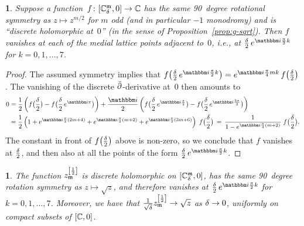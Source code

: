 \documentclass[12pt,oneside,english]{amsart}
\numberwithin{equation}{section}
\numberwithin{figure}{section}
\theoremstyle{plain}
\theoremstyle{plain}
\theoremstyle{plain}
\newtheorem{prop}[thm]{\protect\propositionname}
\theoremstyle{plain}
\newtheorem{lem}[thm]{\protect\lemmaname}
\theoremstyle{remark}
\theoremstyle{definition}
\theoremstyle{plain}
\theoremstyle{plain}
\numberwithin{thm}{section}
\newcommand{\kallemod}[1]{{\color{kallecol} {#1}}}
\providecommand{\lemmaname}{Lemma}
\providecommand{\propositionname}{Proposition}
\providecommand{\lemmaname}{Lemma}
\providecommand{\propositionname}{Proposition}
\providecommand{\lemmaname}{Lemma}
\providecommand{\propositionname}{Proposition}
\providecommand{\lemmaname}{Lemma}
\providecommand{\propositionname}{Proposition}
\begin{document}
\begin{lem}
\label{lem:symmetries-of-disc-sqrt}
Suppose a function~$f \colon {\left[ {\mathbb{C}_{{\delta}}^{\mathfrak{m}}}, 0 \right]} \to \mathbb{C}$ has the same 
90~degree rotational symmetry as $z \mapsto z^{m/2}$ for $m$ odd (and 
in particular $-1$ monodromy) and is ``discrete holomorphic at~$0$''
(in the sense of Proposition~\ref{prop:g-sqrt}). Then $f$ 
vanishes at each of the medial lattice points adjacent to~$0$, i.e., at
$\frac{\meshsz}{2} \, e^{\ii \frac{\pi}{2} k}$ for $k=0,1,\ldots,7$.
\end{lem}
\begin{proof}
The assumed symmetry implies that
$f \big( \frac{\meshsz}{2} \, e^{\ii \frac{\pi}{2} k} \big)
= e^{\ii \frac{\pi}{4} m k} \, f \big( \frac{\meshsz}{2} \big)$.
The vanishing of the discrete ${{\bar{\partial}}}$-derivative at~$0$ then amounts to 
\begin{align*}
0 = \; & \frac{1}{2} \left( 
	  f \big( \frac{\meshsz}{2} \big)
      - f\big( \frac{\meshsz}{2} \, e^{\ii \pi} \big) \right)
  + \frac{\ii}{2} \left(
      f\big( \frac{\meshsz}{2} \, e^{\ii \frac{\pi}{2}} \big)
      - f\big( \frac{\meshsz}{2} \, e^{\ii \frac{3\pi}{2}} \big) \right) \\
= \; & \frac{1}{2} \left( 
		1 + e^{\ii \frac{\pi}{4}(2m+4)}
		+ e^{\ii \frac{\pi}{4}(m+2)} + e^{\ii \frac{\pi}{4}(3m+6)} 
	\right) \; f \big( \frac{\meshsz}{2} \big) \,
= \,\frac{1}{1-e^{\ii \frac{\pi}{4}(m+2)}} \; f \big( \frac{\meshsz}{2} 
\big) .
\end{align*}
The constant in front of $f \big( \frac{{\delta}}{2} \big)$ above is non-zero, 
so we conclude that $f$ vanishes at $\frac{{\delta}}{2}$, and then also at all 
the points of the form
$\frac{\meshsz}{2} \, e^{\ii \frac{\pi}{2} k}$. 
\end{proof}
\begin{prop}
\label{prop:disc-sqrt}
The function $z_{\mathfrak{m}}^{\left[\frac{1}{2}\right]}$
is discrete holomorphic on ${\left[ {\mathbb{C}_{{\delta}}^{\mathfrak{m}}}, 0 \right]}$,
has the same 90~degree rotation symmetry as $z\mapsto\sqrt{z}$, and 
therefore vanishes
at $\frac{\meshsz}{2} \, e^{\ii \frac{\pi}{2} k}$ for $k=0,1,\ldots,7$. 
Moreover, we have
that $\frac{1}{\sqrt{{\delta}}}z_{\mathfrak{m}}^{\left[\frac{1}{2}\right]} \to \sqrt{z}$
as ${\delta} \to 0$, uniformly on compact subsets of $\left[ \mathbb{C},0\right]$.
\end{prop}
\end{document}
